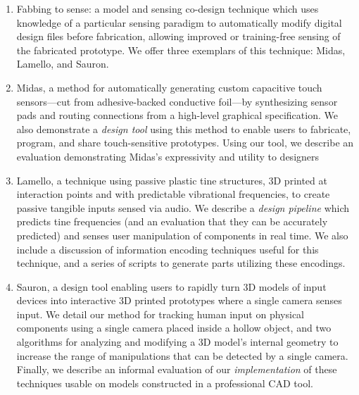 \begin{enumerate}
\item Fabbing to sense: a model and sensing co-design technique which uses knowledge of a particular sensing paradigm to automatically modify digital design files before fabrication, allowing improved or training-free sensing of the fabricated prototype. We offer three exemplars of this technique: Midas, Lamello, and Sauron.
\item Midas, a method for automatically generating custom capacitive touch sensors---cut from adhesive-backed conductive foil---by synthesizing sensor pads and routing connections from a high-level graphical specification. We also demonstrate a \emph{design tool} using this method to enable users to fabricate, program, and share touch-sensitive prototypes. Using our tool, we describe an evaluation demonstrating Midas's expressivity and utility to designers
\item Lamello, a technique using passive plastic tine structures, 3D printed at interaction points and with predictable vibrational frequencies, to create passive tangible inputs sensed via audio. We describe a \emph{design pipeline} which predicts tine frequencies (and an evaluation that they can be accurately predicted) and senses user manipulation of components in real time. We also include a discussion of information encoding techniques useful for this technique, and a series of scripts to generate parts utilizing these encodings.
\item Sauron, a design tool enabling users to rapidly turn 3D models of input devices into interactive 3D printed prototypes where a single camera senses input. We detail our method for tracking human input on physical components using a single camera placed inside a hollow object, and two algorithms for analyzing and modifying a 3D model's internal geometry to increase the range of manipulations that can be detected by a single camera. Finally, we describe an informal evaluation of our \emph{implementation} of these techniques usable on models constructed in a professional CAD tool.
\end{enumerate}